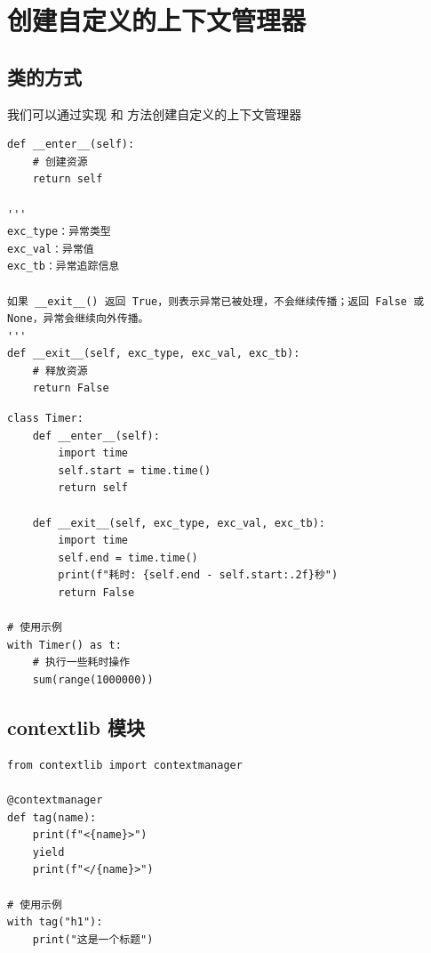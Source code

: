 \section{创建自定义的上下文管理器}
\subsection{类的方式}
我们可以通过实现  和  方法创建自定义的上下文管理器
\begin{lstlisting}[style=demostyle,numbers=none]
def __enter__(self):
    # 创建资源
    return self
    
'''
exc_type：异常类型
exc_val：异常值
exc_tb：异常追踪信息

如果 __exit__() 返回 True，则表示异常已被处理，不会继续传播；返回 False 或 None，异常会继续向外传播。
'''    
def __exit__(self, exc_type, exc_val, exc_tb):
    # 释放资源
    return False    
\end{lstlisting}

\begin{lstlisting}[style=pythonstyle]
class Timer:
    def __enter__(self):
        import time
        self.start = time.time()
        return self
    
    def __exit__(self, exc_type, exc_val, exc_tb):
        import time
        self.end = time.time()
        print(f"耗时: {self.end - self.start:.2f}秒")
        return False

# 使用示例
with Timer() as t:
    # 执行一些耗时操作
    sum(range(1000000))
\end{lstlisting}

\subsection{contextlib 模块}
\begin{lstlisting}[style=pythonstyle]
from contextlib import contextmanager

@contextmanager
def tag(name):
    print(f"<{name}>")
    yield
    print(f"</{name}>")

# 使用示例
with tag("h1"):
    print("这是一个标题")
\end{lstlisting}    

